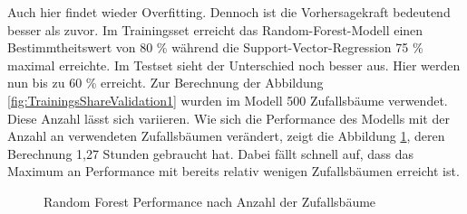 \documentclass[a4paper,12pt]{thesis}
\begin{document}
Auch hier findet wieder Overfitting. Dennoch ist die Vorhersagekraft bedeutend besser als zuvor. Im Trainingsset erreicht das Random-Forest-Modell einen Bestimmtheitswert von 80 \% während die Support-Vector-Regression 75 \% maximal erreichte. Im Testset sieht der Unterschied noch besser aus. Hier werden nun bis zu 60 \% erreicht. Zur Berechnung der Abbildung \ref{fig:TrainingsShareValidation1} wurden im Modell 500 Zufallsbäume verwendet. Diese Anzahl lässt sich variieren. Wie sich die Performance des Modells mit der Anzahl an verwendeten Zufallsbäumen verändert, zeigt die Abbildung \ref{fig:NTreeValidation1}, deren Berechnung 1,27 Stunden gebraucht hat. Dabei fällt schnell auf, dass das Maximum an Performance mit bereits relativ wenigen Zufallsbäumen erreicht ist.

\begin{figure}%
	\centering
	\qquad
	\caption{Random Forest Performance nach Anzahl der Zufallsbäume}%
	\label{fig:NTreeValidation1}%
\end{figure}
\end{document}
